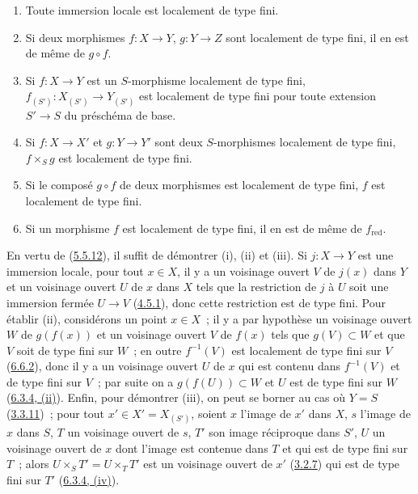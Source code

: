\begin{proposition}[6.6.6]
\label{I.6.6.6-fr}
\begin{enumerate}
  \item[\textup{(i)}] Toute immersion locale est localement de type fini.
  \item[\textup{(ii)}] Si deux morphismes $f:X\to Y$, $g:Y\to Z$ sont localement de
    type fini, il en est de même de $g\circ f$.
  \item[\textup{(iii)}] Si $f:X\to Y$ est un $S$-morphisme localement de type fini,
    $f_{(S')}:X_{(S')}\to Y_{(S')}$ est localement de type fini pour toute
    extension $S'\to S$ du préschéma de base.
  \item[\textup{(iv)}] Si $f:X\to X'$ et $g:Y\to Y'$ sont deux $S$-morphismes
    localement de type fini, $f\times_S g$ est localement de type fini.
  \item[\textup{(v)}] Si le composé $g\circ f$ de deux morphismes est localement de
    type fini, $f$ est localement de type fini.
  \item[\textup{(vi)}] Si un morphisme $f$ est localement de type fini, il en est de
    même de $f_{\mathrm{red}}$.
\end{enumerate}
\end{proposition}

En vertu de (\hyperref[I.5.5.12-fr]{5.5.12}), il suffit de démontrer (i), (ii)
et (iii). Si $j:X\to Y$ est une immersion locale, pour tout $x\in X$, il y a
un voisinage ouvert $V$ de $j(x)$ dans $Y$ et un voisinage ouvert $U$ de $x$
dans $X$ tels que la restriction de $j$ à $U$ soit une immersion fermée
$U\to V$ (\hyperref[I.4.5.1-fr]{4.5.1}), donc cette restriction est de type
fini. Pour établir (ii), considérons un point $x\in X$~; il y a par hypothèse
un voisinage ouvert $W$ de $g(f(x))$ et un voisinage ouvert $V$ de $f(x)$
tels que $g(V)\subset W$ et que $V$ soit de type fini sur $W$~; en outre
$f^{-1}(V)$ est localement de type fini sur $V$
(\hyperref[I.6.6.2-fr]{6.6.2}), donc il y a un voisinage ouvert $U$ de $x$ qui
est contenu dans $f^{-1}(V)$ et de type fini sur $V$~; par suite on a
$g(f(U))\subset W$ et $U$ est de type fini sur $W$
(\hyperref[I.6.3.4-fr]{6.3.4, (ii)}). Enfin, pour démontrer (iii), on peut se
borner au cas où $Y=S$ (\hyperref[I.3.3.11-fr]{3.3.11})~; pour tout
$x'\in X'=X_{(S')}$, soient $x$ l'image de $x'$ dans $X$, $s$ l'image de $x$
dans $S$, $T$ un voisinage ouvert de $s$, $T'$ son image réciproque dans $S'$,
$U$ un voisinage ouvert de $x$ dont l'image est contenue dans $T$ et qui est de
type fini sur $T$~; alors $U\times_S T'=U\times_T T'$ est un voisinage ouvert
de $x'$ (\hyperref[I.3.2.7-fr]{3.2.7}) qui est de type fini sur $T'$
(\hyperref[I.6.3.4-fr]{6.3.4, (iv)}).


